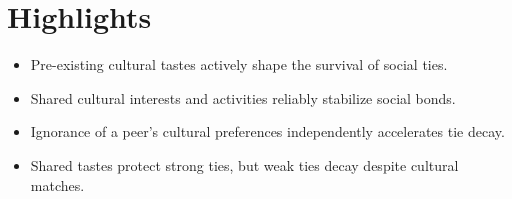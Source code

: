 \documentclass[
  letterpaper,
  DIV=11,
  numbers=noendperiod]{scrartcl}
\begin{document}
\section{Highlights}
\begin{itemize}
    \item Pre-existing cultural tastes actively shape the survival of social ties. 
    \item Shared cultural interests and activities reliably stabilize social bonds. 
    \item Ignorance of a peer's cultural preferences independently accelerates tie decay. 
    \item Shared tastes protect strong ties, but weak ties decay despite cultural matches. 
\end{itemize}
\end{document}
